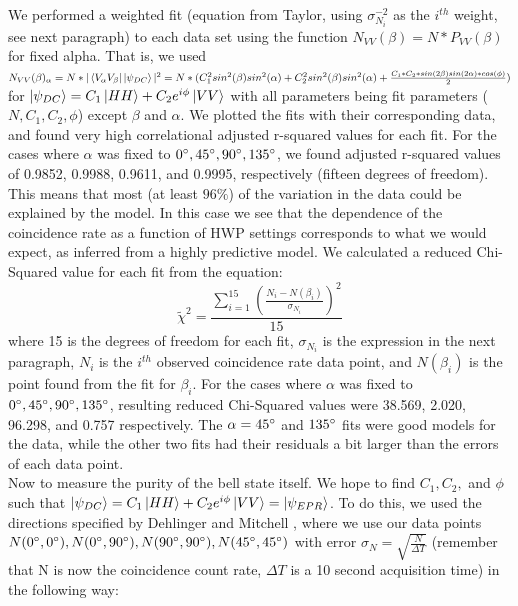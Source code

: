 \documentclass{article}
\begin{document}
    \indent We performed a weighted fit \cite{err} (equation from Taylor, using $\sigma_{N_i}^{-2}$ as the $i^{th}$ weight, see next paragraph) to each data set using the function $N_{VV}(\beta) = N*P_{VV}(\beta)$ for fixed alpha. That is, we used $N_{VV}(\beta)_\alpha = N*|\left\langle{V_\alpha V_\beta}\right\vert\left\vert{\psi_{DC}}\right\rangle|^2 = N*(C_1^2sin^2(\beta)sin^2(\alpha)+C_2^2sin^2(\beta)sin^2(\alpha)+\frac{C_1*C_2*sin(2\beta)sin(2\alpha)*cos(\phi)}{2})$ for $\left\vert{\psi_{DC}}\right\rangle = C_1\left\vert{HH}\right\rangle + C_2e^{i\phi}\left\vert{VV}\right\rangle$ with all parameters being fit parameters ($N,C_1,C_2,\phi$) except $\beta$ and $\alpha$. We plotted the fits with their corresponding data, and found very high correlational adjusted r-squared values for each fit. For the cases where $\alpha$ was fixed to $0\degree,45\degree,90\degree,135\degree$, we found adjusted r-squared values of 0.9852, 0.9988, 0.9611, and 0.9995, respectively (fifteen degrees of freedom). This means that most (at least $96\%$) of the variation in the data could be explained by the model. In this case we see that the dependence of the coincidence rate as a function of HWP settings corresponds to what we would expect, as inferred from a highly predictive model. We calculated a reduced Chi-Squared value for each fit from the equation:
    \begin{equation}
        \tilde{\chi}^2 = \frac{\sum_{i=1}^{15}(\frac{N_i - N(\beta_i)}{\sigma_{N_i}})^2}{15}
    \end{equation}
    where 15 is the degrees of freedom for each fit, $\sigma_{N_i}$ is the expression in the next paragraph, $N_i$ is the $i^{th}$ observed coincidence rate data point, and $N(\beta_i)$ is the point found from the fit for $\beta_i$. For the cases where $\alpha$ was fixed to $0\degree,45\degree,90\degree,135\degree$, resulting reduced Chi-Squared values were 38.569,  2.020, 96.298, and 0.757 respectively. The $\alpha = 45\degree$ and $135\degree$ fits were good models for the data, while the other two fits had their residuals a bit larger than the errors of each data point.
    \\\indent Now to measure the purity of the bell state itself. We hope to find $C_1,C_2,$ and $\phi$ such that $\left\vert{\psi_{DC}}\right\rangle = C_1\left\vert{HH}\right\rangle + C_2e^{i\phi}\left\vert{VV}\right\rangle = \left\vert{\psi_{EPR}}\right\rangle$. To do this, we used the directions specified by Dehlinger and Mitchell \cite{deh}, where we use our data points $N(0\degree,0\degree),N(0\degree,90\degree),N(90\degree,90\degree),N(45\degree,45\degree)$ with error $\sigma_N = \sqrt{\frac{N}{\Delta T}}$ (remember that N is now the coincidence count rate, $\Delta T$ is a 10 second acquisition time) in the following way:
\end{document}
